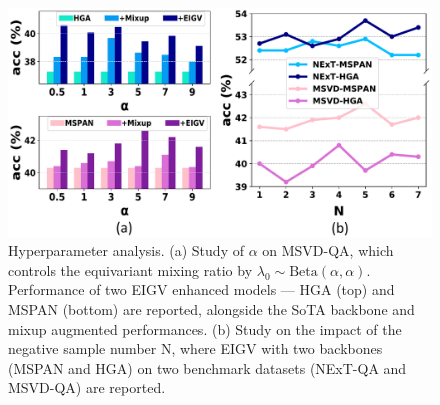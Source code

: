 \begin{figure}[t]
\centering
\includegraphics[scale=0.35]{fig/fig5.pdf}
\vspace{-10pt}
\caption{Hyperparameter analysis. (a) Study of $\alpha$ on MSVD-QA, which controls the equivariant mixing ratio by $\lambda_0\sim\text{Beta}(\alpha,\alpha)$. Performance of two EIGV enhanced models --- HGA (top) and MSPAN (bottom) are reported, alongside the SoTA backbone and mixup augmented performances.  
(b) Study on the impact of the negative sample number N, where EIGV with two backbones (\ie MSPAN and HGA) on two benchmark datasets (NExT-QA and MSVD-QA) are reported.}
\vspace{-10pt}
\label{fig:neg}
\end{figure}